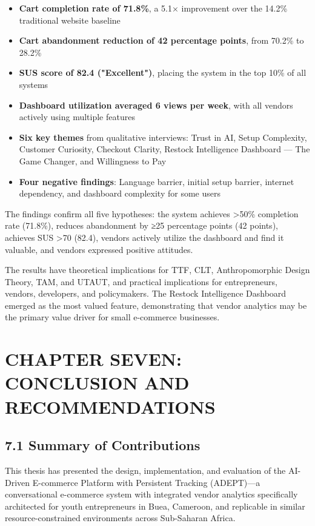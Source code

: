 \documentclass[12pt,a4paper]{article}
\begin{document}
\begin{itemize}
    \item \textbf{Cart completion rate of 71.8\%}, a 5.1× improvement over the 14.2\% traditional website baseline
    \item \textbf{Cart abandonment reduction of 42 percentage points}, from 70.2\% to 28.2\%
    \item \textbf{SUS score of 82.4 ("Excellent")}, placing the system in the top 10\% of all systems
    \item \textbf{Dashboard utilization averaged 6 views per week}, with all vendors actively using multiple features
    \item \textbf{Six key themes} from qualitative interviews: Trust in AI, Setup Complexity, Customer Curiosity, Checkout Clarity, Restock Intelligence Dashboard --- The Game Changer, and Willingness to Pay
    \item \textbf{Four negative findings}: Language barrier, initial setup barrier, internet dependency, and dashboard complexity for some users
\end{itemize}

The findings confirm all five hypotheses: the system achieves >50\% completion rate (71.8\%), reduces abandonment by ≥25 percentage points (42 points), achieves SUS >70 (82.4), vendors actively utilize the dashboard and find it valuable, and vendors expressed positive attitudes.

The results have theoretical implications for TTF, CLT, Anthropomorphic Design Theory, TAM, and UTAUT, and practical implications for entrepreneurs, vendors, developers, and policymakers. The Restock Intelligence Dashboard emerged as the most valued feature, demonstrating that vendor analytics may be the primary value driver for small e-commerce businesses.

\newpage

\section{CHAPTER SEVEN: CONCLUSION AND RECOMMENDATIONS}

\subsection{7.1 Summary of Contributions}

This thesis has presented the design, implementation, and evaluation of the AI-Driven E-commerce Platform with Persistent Tracking (ADEPT)---a conversational e-commerce system with integrated vendor analytics specifically architected for youth entrepreneurs in Buea, Cameroon, and replicable in similar resource-constrained environments across Sub-Saharan Africa.
\end{document}
